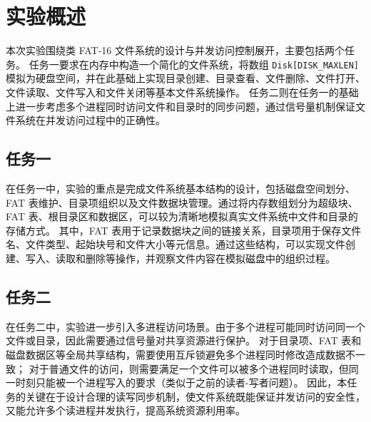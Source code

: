 \section{实验概述}
本次实验围绕类 FAT-16 文件系统的设计与并发访问控制展开，主要包括两个任务。
任务一要求在内存中构造一个简化的文件系统，将数组 \texttt{Disk[DISK\_MAXLEN]} 模拟为硬盘空间，并在此基础上实现目录创建、目录查看、文件删除、文件打开、文件读取、文件写入和文件关闭等基本文件系统操作。
任务二则在任务一的基础上进一步考虑多个进程同时访问文件和目录时的同步问题，通过信号量机制保证文件系统在并发访问过程中的正确性。
\subsection{任务一}
在任务一中，实验的重点是完成文件系统基本结构的设计，包括磁盘空间划分、FAT 表维护、目录项组织以及文件数据块管理。通过将内存数组划分为超级块、FAT 表、根目录区和数据区，可以较为清晰地模拟真实文件系统中文件和目录的存储方式。
其中，FAT 表用于记录数据块之间的链接关系，目录项用于保存文件名、文件类型、起始块号和文件大小等元信息。通过这些结构，可以实现文件创建、写入、读取和删除等操作，并观察文件内容在模拟磁盘中的组织过程。

\subsection{任务二}
在任务二中，实验进一步引入多进程访问场景。由于多个进程可能同时访问同一个文件或目录，因此需要通过信号量对共享资源进行保护。
对于目录项、FAT 表和磁盘数据区等全局共享结构，需要使用互斥锁避免多个进程同时修改造成数据不一致；
对于普通文件的访问，则需要满足一个文件可以被多个进程同时读取，但同一时刻只能被一个进程写入的要求（类似于之前的读者-写者问题）。
因此，本任务的关键在于设计合理的读写同步机制，使文件系统既能保证并发访问的安全性，又能允许多个读进程并发执行，提高系统资源利用率。